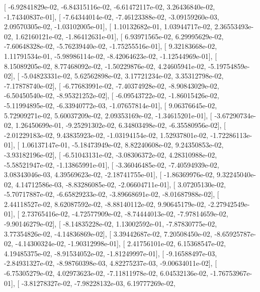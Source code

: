 \documentclass{article}
\begin{document}
       [ -6.92841829e-02,  -6.84315116e-02,  -6.61472117e-02,
          3.26436840e-02,  -1.74340837e-01],
       [ -7.64344014e-02,  -7.46123388e-02,  -3.09159260e-03,
          2.09570305e-02,  -1.03102005e-01],
       [  1.10132682e-01,   1.03944717e-02,   2.36553493e-02,
          1.62160121e-02,  -1.86412631e-01],
       [  6.93971565e-02,   6.29995629e-02,  -7.60648328e-02,
         -5.76239440e-02,  -1.75255516e-01],
       [  9.32183668e-02,   1.11791534e-01,  -5.98986114e-02,
         -8.42064623e-02,  -1.12544969e-01],
       [  8.15089205e-02,   8.77468092e-02,  -1.50229876e-02,
          4.24605941e-02,  -5.19754859e-02],
       [ -5.04823331e-02,   5.62562898e-02,   3.17721234e-02,
          3.35312798e-02,  -7.17878740e-02],
       [ -6.77683991e-02,  -7.40374928e-02,  -8.90843029e-02,
         -6.50450540e-02,  -8.95321252e-02],
       [ -6.09543722e-02,  -1.86015426e-02,  -5.11994895e-02,
         -6.33940772e-03,  -1.07657814e-01],
       [  9.06376645e-02,   5.72909271e-02,   5.60037209e-02,
          2.09353169e-02,  -1.34615201e-01],
       [ -3.67290734e-02,   1.26450699e-01,  -9.25291302e-02,
          6.34803498e-02,  -6.35580956e-02],
       [ -2.01229183e-02,   9.43835923e-02,  -1.03194154e-02,
          1.52937801e-02,  -1.72286113e-01],
       [  1.06137147e-01,  -5.18473949e-02,   8.82240608e-02,
          9.24350853e-02,  -3.93182196e-02],
       [ -6.51043131e-02,  -3.08306372e-02,   4.28310988e-02,
         -5.58521947e-02,  -1.13865991e-01],
       [ -3.36046485e-02,  -7.40594939e-02,   3.08343046e-03,
          4.39569623e-02,  -2.18741755e-01],
       [ -1.86369976e-02,   9.32245040e-02,   4.14712586e-03,
         -8.83286085e-02,  -2.06604711e-01],
       [  3.07205130e-02,  -5.70717887e-02,  -6.65829233e-02,
         -3.89668691e-02,  -8.01687988e-02],
       [  2.44118527e-02,   8.62087592e-02,  -8.88140112e-02,
          9.90645179e-02,  -2.27942549e-01],
       [  2.73765416e-02,  -4.72577909e-02,  -8.74444013e-02,
         -7.97814659e-02,  -9.90146279e-02],
       [ -8.14835228e-02,   1.13002592e-01,  -7.87830775e-02,
          3.77354826e-02,  -4.14836869e-02],
       [  3.39442687e-02,   7.20508450e-02,  -8.65925787e-02,
         -4.14300324e-02,  -1.90312998e-01],
       [  2.41756101e-02,   6.15368547e-02,   4.19485375e-02,
         -8.91534052e-02,  -1.81249997e-01],
       [ -9.16588497e-03,  -2.84931327e-02,  -8.98760398e-03,
          4.82275237e-03,  -9.00634011e-02],
       [ -6.75305279e-02,   4.02973623e-02,  -7.11811978e-02,
          6.04532136e-02,  -1.76753967e-01],
       [ -3.81278327e-02,  -7.98228132e-03,   6.19777269e-02,
\end{document}
